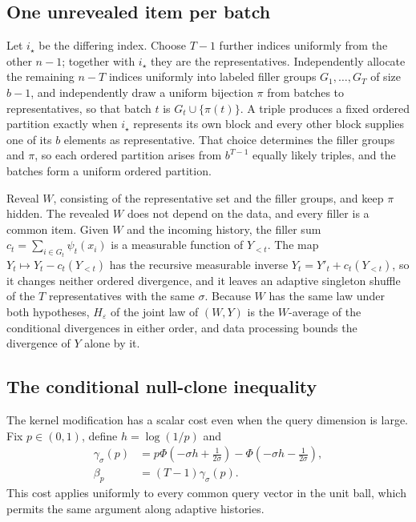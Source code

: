 \documentclass[conference]{IEEEtran}
\newcommand{\eps}{\varepsilon}
\begin{document}
\subsection{One unrevealed item per batch}\label{sec:singleton}
Let $i_\star$ be the differing index. Choose $T-1$ further indices uniformly from the other $n-1$; together with $i_\star$ they are the representatives. Independently allocate the remaining $n-T$ indices uniformly into labeled filler groups $G_1,\ldots,G_T$ of size $b-1$, and independently draw a uniform bijection $\pi$ from batches to representatives, so that batch $t$ is $G_t\cup\{\pi(t)\}$. A triple produces a fixed ordered partition exactly when $i_\star$ represents its own block and every other block supplies one of its $b$ elements as representative. That choice determines the filler groups and $\pi$, so each ordered partition arises from $b^{T-1}$ equally likely triples, and the batches form a uniform ordered partition.

Reveal $W$, consisting of the representative set and the filler groups, and keep $\pi$ hidden. The revealed $W$ does not depend on the data, and every filler is a common item. Given $W$ and the incoming history, the filler sum $c_t=\sum_{i\in G_t}\psi_t(x_i)$ is a measurable function of $Y_{<t}$. The map $Y_t\mapsto Y_t-c_t(Y_{<t})$ has the recursive measurable inverse $Y_t=Y'_t+c_t(Y_{<t})$, so it changes neither ordered divergence, and it leaves an adaptive singleton shuffle of the $T$ representatives with the same $\sigma$. Because $W$ has the same law under both hypotheses, $H_\eps$ of the joint law of $(W,Y)$ is the $W$-average of the conditional divergences in either order, and data processing bounds the divergence of $Y$ alone by it.

\subsection{The conditional null-clone inequality}
The kernel modification has a scalar cost even when the query dimension is large. Fix $p\in(0,1)$, define $h=\log(1/p)$ and
\begin{align}
 \gamma_\sigma(p)&=p\Phi\left(-\sigma h+\frac1{2\sigma}\right)
 -\Phi\left(-\sigma h-\frac1{2\sigma}\right),\label{eq:gamma}\\
 \beta_p&=(T-1)\gamma_\sigma(p).\nonumber
\end{align}
This cost applies uniformly to every common query vector in the unit ball, which permits the same argument along adaptive histories.
\end{document}
